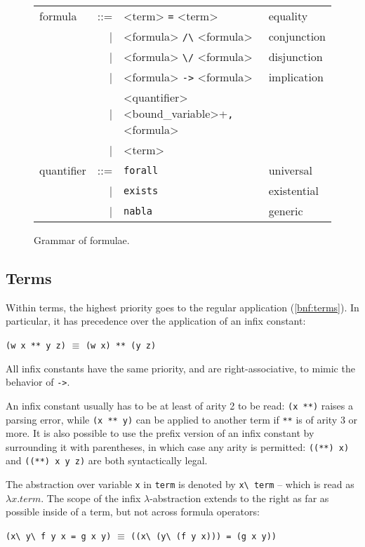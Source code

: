 \begin{figure}
  \centering
  \begin{tabular}{lrll}
    formula    &::=& <term> \lstinline!=! <term>        & equality \\
               & | & <formula> \lstinline!/\! <formula> & conjunction \\
               & | & <formula> \lstinline!\/! <formula> & disjunction \\
               & | & <formula> \lstinline!->! <formula> & implication \\
               & | & <quantifier> <bound\_variable>+\lstinline!,!
                     <formula> & \\
               & | & <term> & \\
    quantifier &::=& \lstinline!forall!                 & universal \\
               & | & \lstinline!exists!                 & existential \\
               & | & \lstinline!nabla!                  & generic \\
  \end{tabular}
  \caption{Grammar of formulae.\label{bnf:formulae}}
\end{figure}

\subsection{Terms}

Within terms, the highest priority goes to the regular application
(\autoref{bnf:terms}).  In particular, it has precedence over the
application of an infix constant:
\begin{center}
  \lstinline{(w x ** y z)}  $\equiv$
  \lstinline{(w x) ** (y z)}
\end{center}
All infix constants have the same priority, and are right-associative,
to mimic the behavior of \lstinline{->}.

An infix constant usually has to be at least of arity 2 to be read:
\lstinline{(x **)} raises a parsing error, while \lstinline{(x ** y)}
can be applied to another term if \lstinline{**} is of arity 3 or more.
It is also possible to use the prefix version of an infix constant by
surrounding it with parentheses, in which case any arity is permitted:
\lstinline{((**) x)} and \lstinline{((**) x y z)} are both syntactically
legal.

The abstraction over variable \lstinline{x} in \lstinline{term} is
denoted by \lstinline{x\ term} -- which is read as $\lambda x. term$.
The scope of the infix $\lambda$-abstraction extends to the right as far
as possible inside of a term, but not across formula operators:
\begin{center}
  \lstinline{(x\ y\ f y x = g x y)} $\equiv$
  \lstinline{((x\ (y\ (f y x))) = (g x y))}
\end{center}

